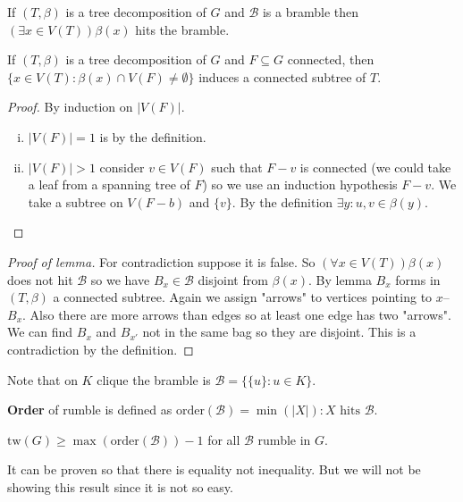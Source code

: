 \begin{lemma}[duality]
	If $(T, \beta)$ is a tree decomposition of $G$ and $\mathcal{B}$ is a bramble then $(\exists x \in V(T)) \beta(x)$ hits the bramble.
\end{lemma}

\begin{observ}
	If $(T, \beta)$ is a tree decomposition of $G$ and $F \subseteq G$ connected, then $\{x \in V(T) : \beta(x) \cap V(F) \neq \emptyset\}$ induces a connected subtree of $T$.
\end{observ}

\begin{proof}
	By induction on $|V(F)|$.
	
	\begin{enumerate}[(i)]
		\item $|V(F)| = 1$ is by the definition.
		\item $|V(F)| > 1$ consider $v \in V(F)$ such that $F - v$ is connected (we could take a leaf from a spanning tree of $F$) so we use an induction hypothesis $F - v$. We take a subtree on $V(F-b)$ and $\{v\}$. By the definition $\exists y: u,v \in \beta(y)$.
	\end{enumerate}
\end{proof}

\begin{proof}[Proof of lemma]
	For contradiction suppose it is false. So $(\forall x \in V(T)) \beta (x)$ does not hit $\mathcal{B}$ so we have $B_{x} \in \mathcal{B}$ disjoint from $\beta(x)$. By lemma $B_{x}$ forms in $(T, \beta)$ a connected subtree. Again we assign "arrows" to vertices pointing to $x$--$B_{x}$. Also there are more arrows than edges so at least one edge has two "arrows". We can find $B_{x}$ and $B_{x'}$ not in the same bag so they are disjoint. This is a contradiction by the definition.
\end{proof}

Note that on $K$ clique the bramble is $\mathcal{B} = \{\{u\}: u \in K\}$.

\begin{defn}
	\textbf{Order} of rumble is defined as $\text{order}(\mathcal{B}) = \min (|X|): X \text{ hits } \mathcal{B}$.
\end{defn} 

\begin{cor}
	$\text{tw}(G) \geq \max (\text{order}(\mathcal{B})) - 1$ for all $\mathcal{B}$ rumble in $G$.
\end{cor}

\begin{rem}
	It can be proven so that there is equality not inequality. But we will not be showing this result since it is not so easy.
\end{rem}

